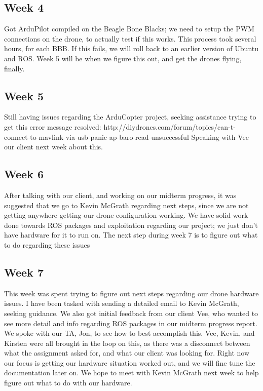 \documentclass[IEEEtran,letterpaper,10pt,notitlepage,draftclsnofoot,onecolumn]{article}
\begin{document}
  \subsection{Week 4}
  Got ArduPilot compiled on the Beagle Bone Blacks; we need to setup the PWM connections on the drone, to actually test if this works. This process took several hours, for each BBB. If this fails, we will roll back to an earlier version of Ubuntu and ROS. Week 5 will be when we figure this out, and get the drones flying, finally.

  \subsection{Week 5}
  Still having issues regarding the ArduCopter project, seeking assistance trying to get this error message resolved: http://diydrones.com/forum/topics/can-t-connect-to-mavlink-via-usb-panic-ap-baro-read-unsuccessful Speaking with Vee our client next week about this.

  \subsection{Week 6}
  After talking with our client, and working on our midterm progress, it was suggested that we go to Kevin McGrath regarding next steps, since we are not getting anywhere getting our drone configuration working. We have solid work done towards ROS packages and exploitation regarding our project; we just don't have hardware for it to run on. The next step during week 7 is to figure out what to do regarding these issues

  \subsection{Week 7}
  This week was spent trying to figure out next steps regarding our drone hardware issues. I have been tasked with sending a detailed email to Kevin McGrath, seeking guidance. We also got initial feedback from our client Vee, who wanted to see more detail and info regarding ROS packages in our midterm progress report. We spoke with our TA, Jon, to see how to best accomplish this. Vee, Kevin, and Kirsten were all brought in the loop on this, as there was a disconnect between what the assignment asked for, and what our client was looking for. Right now our focus is getting our hardware situation worked out, and we will fine tune the documentation later on. We hope to meet with Kevin McGrath next week to help figure out what to do with our hardware.
\end{document}
